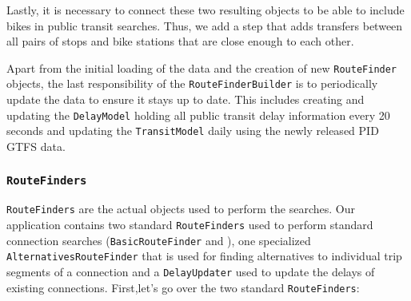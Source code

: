\vspace{10pt}

Lastly, it is necessary to connect these two resulting objects to be able to include bikes in public transit searches. Thus, we add a step that adds transfers between all pairs of stops and bike stations that are close enough to each other.

\vspace{10pt}

Apart from the initial loading of the data and the creation of new \texttt{RouteFinder} objects, the last responsibility of the \texttt{RouteFinderBuilder} is to periodically update the data to ensure it stays up to date. This includes creating and updating the \texttt{DelayModel} holding all public transit delay information every 20 seconds and updating the \texttt{TransitModel} daily using the newly released PID GTFS data.

\subsubsection{\texttt{RouteFinders}}

\texttt{RouteFinders} are the actual objects used to perform the searches. Our application contains two standard \texttt{RouteFinders} used to perform standard connection searches (\texttt{BasicRouteFinder} and ), one specialized \texttt{AlternativesRouteFinder} that is used for finding alternatives to individual trip segments of a connection and a \texttt{DelayUpdater} used to update the delays of existing connections. First,let's go over the two standard \texttt{RouteFinders}:

